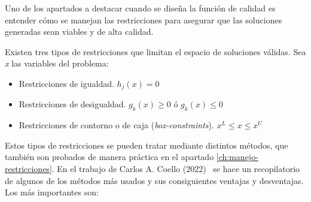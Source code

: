 Uno de los apartados a destacar cuando se diseña la función de calidad es entender cómo se manejan las restricciones para asegurar que las soluciones generadas sean viables y de alta calidad.

Existen tres tipos de restricciones que limitan el espacio de soluciones válidas. Sea \textit{x} las variables del problema:

\begin{itemize}
  \item Restricciones de igualdad. $h_j(x) = 0$
  \item Restricciones de desigualdad. $g_k(x) \geq 0$ ó $g_k(x) \leq 0$
  \item Restricciones de contorno o de caja (\textit{box-constraints}). $x^L \leq x \leq x^U$
\end{itemize}

Estos tipos de restricciones se pueden tratar mediante distintos métodos, que también son probados de manera práctica en el apartado \ref{ch:manejo-restricciones}. En el trabajo de Carlos A. Coello (2022)~\cite{Coello2022} se hace un recopilatorio de algunos de los métodos más usados y sus consiguientes ventajas y desventajas. Los más importantes son:

